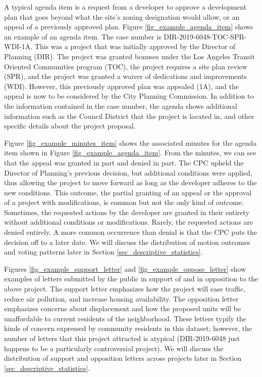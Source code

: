 A typical agenda item is a request from a developer to approve a development plan that goes beyond what the site's zoning designation would allow, or an appeal of a previously approved plan. Figure \ref{fig_example_agenda_item} shows an example of an agenda item. The case number is DIR-2019-6048-TOC-SPR-WDI-1A. This was a project that was initially approved by the Director of Planning (DIR). The project was granted bonuses under the Los Angeles Transit Oriented Communities program (TOC), the project requires a site plan review (SPR), and the project was granted a waiver of dedications and improvements (WDI). However, this previously approved plan was appealed (1A), and the appeal is now to be considered by the City Planning Commission. In addition to the information contained in the case number, the agenda shows additional information such as the Council District that the project is located in, and other specific details about the project proposal.

Figure \ref{fig_example_minutes_item} shows the associated minutes for the agenda item shown in Figure \ref{fig_example_agenda_item}. From the minutes, we can see that the appeal was granted in part and denied in part. The CPC upheld the Director of Planning's previous decision, but additional conditions were applied, thus allowing the project to move forward as long as the developer adheres to the new conditions. This outcome, the partial granting of an appeal or the approval of a project with modifications, is common but not the only kind of outcome. Sometimes, the requested actions by the developer are granted in their entirety without additional conditions or modifications. Rarely, the requested actions are denied entirely. A more common occurrence than denial is that the CPC puts the decision off to a later date. We will discuss the distribution of motion outcomes and voting patterns later in Section \ref{sec_descriptive_statistics}.

Figures \ref{fig_example_support_letter} and \ref{fig_example_oppose_letter} show examples of letters submitted by the public in support of and in opposition to the above project. The support letter emphasizes how the project will ease traffic, reduce air pollution, and increase housing availability. The opposition letter emphasizes concerns about displacement and how the proposed units will be unaffordable to current residents of the neighborhood. These letters typify the kinds of concern expressed by community residents in this dataset; however, the number of letters that this project attracted is atypical (DIR-2019-6048 just happens to be a particularly controversial project). We will discuss the distribution of support and opposition letters across projects later in Section \ref{sec_descriptive_statistics}.

